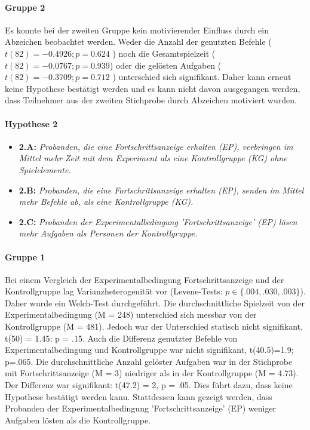 \paragraph{Gruppe 2}
Es konnte bei der zweiten Gruppe kein motivierender Einfluss durch ein Abzeichen beobachtet werden. Weder die Anzahl der genutzten Befehle ( $ t(82)=-0.4926; p=0.624 $ ) noch die Gesamtspielzeit ($t(82)=-0.0767; p=0.939$) oder die gelösten Aufgaben ( $t(82)=-0.3709; p=0.712$ ) unterschied sich signifikant. Daher kann erneut keine Hypothese bestätigt werden und es kann nicht davon ausgegangen werden, dass Teilnehmer aus der zweiten Stichprobe durch Abzeichen motiviert wurden. 


\paragraph{Hypothese 2}
\begin{itemize}
    \item \textbf{2.A:} \textit{Probanden, die eine Fortschrittsanzeige erhalten (EP), verbringen im Mittel mehr Zeit mit dem Experiment als eine Kontrollgruppe (KG) ohne Spielelemente.}
    \item \textbf{2.B:} \textit{Probanden, die eine Fortschrittsanzeige erhalten (EP), senden im Mittel mehr Befehle ab, als eine Kontrollgruppe (KG).}
    \item \textbf{2.C:} \textit{Probanden der Experimentalbedingung 'Fortschrittsanzeige' (EP) lösen mehr Aufgaben als Personen der Kontrollgruppe.} 
\end{itemize}

\paragraph{Gruppe 1}
Bei einem Vergleich der Experimentalbedingung Fortschrittsanzeige und der Kontrollgruppe lag Varianzheterogenität vor (Levene-Tests: $p\in\{.004, .030, .003\}$). Daher wurde ein Welch-Test durchgeführt. Die durchschnittliche Spielzeit von der Experimentalbedingung (M = 248) unterschied sich messbar von der Kontrollgruppe (M = 481). Jedoch war der Unterschied statisch nicht signifikant, t(50) = 1.45; p = .15. Auch die Differenz genutzter Befehle von Experimentalbedingung und Kontrollgruppe war nicht signifikant, t(40.5)=1.9; p=.065. Die durchschnittliche Anzahl gelöster Aufgaben war in der Stichprobe mit Fortschrittsanzeige (M = 3) niedriger als in der Kontrollgruppe (M = 4.73). Der Differenz war signifikant: t(47.2) = 2, p = .05. Dies führt dazu, dass keine Hypothese bestätigt werden kann. Stattdessen kann gezeigt werden, dass Probanden der Experimentalbedingung 'Fortschrittsanzeige' (EP) weniger Aufgaben lösten als die Kontrollgruppe. 


